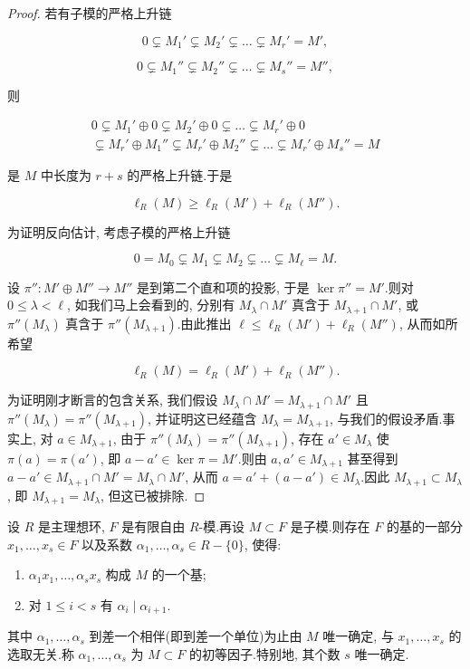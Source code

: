 \begin{proof}
若有子模的严格上升链

\[
0 \subsetneq M_1' \subsetneq M_2' \subsetneq \ldots \subsetneq M_r' = M',\]

\[
0 \subsetneq M_1'' \subsetneq M_2'' \subsetneq \ldots \subsetneq M_s'' = M'',\]

则

\[
\begin{array}{c}
0 \subsetneq M_1' \oplus 0 \subsetneq M_2' \oplus 0 \subsetneq \ldots \subsetneq M_r' \oplus 0 \\
\subsetneq M_r' \oplus M_1'' \subsetneq M_r' \oplus M_2'' \subsetneq \ldots \subsetneq M_r' \oplus M_s'' = M
\end{array}\]

是 $M$ 中长度为 $r + s$ 的严格上升链.于是

\[
\ell_R(M) \geq \ell_R(M') + \ell_R(M'')\text{.}\]

为证明反向估计, 考虑子模的严格上升链

\[
0 = M_0 \subsetneq M_1 \subsetneq M_2 \subsetneq \ldots \subsetneq M_\ell = M\text{.}\]

设 $\pi'' \colon M' \oplus M'' \longrightarrow M''$ 是到第二个直和项的投影, 于是 $\ker \pi'' = M'$.则对 $0 \leq \lambda < \ell$, 如我们马上会看到的, 分别有 $M_\lambda \cap M'$ 真含于 $M_{\lambda + 1} \cap M'$, 或 $\pi''(M_\lambda)$ 真含于 $\pi''(M_{\lambda + 1})$.由此推出 $\ell \leq \ell_R(M') + \ell_R(M'')$, 从而如所希望

\[
\ell_R(M) = \ell_R(M') + \ell_R(M'')\text{.}\]

为证明刚才断言的包含关系, 我们假设 $M_\lambda \cap M' = M_{\lambda + 1} \cap M'$ 且 $\pi''(M_\lambda) = \pi''(M_{\lambda + 1})$, 并证明这已经蕴含 $M_\lambda = M_{\lambda + 1}$, 与我们的假设矛盾.事实上, 对 $a \in M_{\lambda + 1}$, 由于 $\pi''(M_\lambda) = \pi''(M_{\lambda + 1})$, 存在 $a' \in M_\lambda$ 使 $\pi(a) = \pi(a')$, 即 $a - a' \in \ker \pi = M'$.则由 $a, a' \in M_{\lambda + 1}$ 甚至得到 $a - a' \in M_{\lambda + 1} \cap M' = M_\lambda \cap M'$, 从而 $a = a' + (a - a') \in M_\lambda$.因此 $M_{\lambda + 1} \subset M_\lambda$, 即 $M_{\lambda + 1} = M_\lambda$, 但这已被排除.
\end{proof}


\begin{bigtheorem}\label{bigthm:6.3.4}
设 $R$ 是主理想环, $F$ 是有限自由 $R$-模.再设 $M \subset F$ 是子模.则存在 $F$ 的基的一部分 $x_1, \ldots, x_s \in F$ 以及系数 $\alpha_1, \ldots, \alpha_s \in R - \{0\}$, 使得:
\begin{enumerate}
\item[(i)] $\alpha_1 x_1, \ldots, \alpha_s x_s$ 构成 $M$ 的一个基;
\item[(ii)] 对 $1 \leq i < s$ 有 $\alpha_i \mid \alpha_{i + 1}$.
\end{enumerate}
其中 $\alpha_1, \ldots, \alpha_s$ 到差一个相伴(即到差一个单位)为止由 $M$ 唯一确定, 与 $x_1, \ldots, x_s$ 的选取无关.称 $\alpha_1, \ldots, \alpha_s$ 为 $M \subset F$ 的初等因子.特别地, 其个数 $s$ 唯一确定.
\end{bigtheorem}

